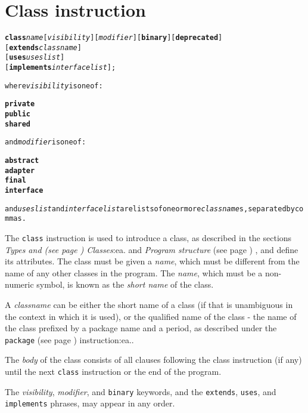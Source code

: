 \chapter{Class instruction}\label{refclass}
\index{,}
\index{,}
\begin{shaded}
\begin{alltt}
\textbf{class} \emph{name} [\emph{visibility}] [\emph{modifier}] [\textbf{binary}] [\textbf{deprecated}]
               [\textbf{extends} \emph{classname}]
               [\textbf{uses} \emph{useslist}]
               [\textbf{implements} \emph{interfacelist}];

where \emph{visibility} is one of:

    \textbf{private}
    \textbf{public}
    \textbf{shared}

and \emph{modifier} is one of:

    \textbf{abstract}
    \textbf{adapter}
    \textbf{final}
    \textbf{interface}

and \emph{useslist} and \emph{interfacelist} are lists of one or more \emph{classname}s, separated by commas.
\end{alltt}
\end{shaded}
 The \texttt{class} instruction is used to introduce a class, as
described in the sections  \emph{Types and (see page \pageref{reftypes}) 
Classes}:ea. and  \emph{Program structure} (see page \pageref{refpstruct}) ,
and define its attributes.
The class must be given a \emph{name}, which must be different from
the name of any other classes in the program.
The \emph{name}, which must be a non-numeric symbol, is known as the
\emph{short name} of the class.
 
A \emph{classname} can be either the short name of a class (if that is
unambiguous in the context in which it is used), or the qualified name
of the class - the name of the class prefixed by a package name and
a period, as described under the  \texttt{package} (see page \pageref{refpackage}) 
instruction:ea..
 
The \emph{body} of the class consists of all clauses following the
class instruction (if any) until the next \texttt{class} instruction or
the end of the program.
 
The \emph{visibility}, \emph{modifier}, and \texttt{binary}
keywords, and the \texttt{extends}, \texttt{uses}, and
\texttt{implements} phrases, may appear in any order.
